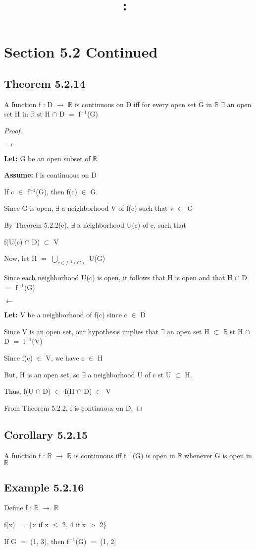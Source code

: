\documentclass{article}
\title{
    \vspace{2in}
    \textmd{\textbf{\hmwkClass:\ \hmwkTitle}}\\
    \normalsize\vspace{0.1in}\small\vspace{0.1in}\large{\textit{\hmwkClassInstructor}}
    \vspace{3in}
}
\author{\hmwkAuthorName}
\date{}
\newcommand{\mt}[1]{\ensuremath{#1}}
\newcommand\bsc[2][\DefaultOpt]{%
  \def\DefaultOpt{#2}%
  \section[#1]{#2}%
}
\newcommand\ssc[2][\DefaultOpt]{%
  \def\DefaultOpt{#2}%
  \subsection[#1]{#2}%
}
\newcommand{\bgpf}{\begin{proof} $ $\newline}
\newcommand{\lt}[1]{\textbf{Let: } #1}
\newcommand{\as}[1]{\textbf{Assume: } #1}
\newcommand{\epf}{\end{proof}}
\newcommand{\br}{\mt{\mathbb{R}} }       %
\newcommand{\mem}{\mt{\in} }
\newcommand{\exs}{\mt{\exists} }
\newcommand{\sbs}{\mt{\subset} }         %
\newcommand{\lra}{ \mt{\longrightarrow} } %
\newcommand{\lla}{ \mt{\longleftarrow} }  %
\newcommand{\bk}[1]{\{#1\}}
\newcommand{\gr}{\mt{>} }
\newcommand{\lse}{\mt{\leq} }
\newcommand{\eql}{\mt{=} }
\newcommand{\uf}[2]{#1\mt{^{#2}}}
\newcommand{\urng}[2]{\mt{\bigcup_{#1}^{#2}}}
\newcommand{\inn}{\mt{\cap} }
\begin{document}
\bsc{Section 5.2 Continued}{
\ssc{Theorem 5.2.14}{

A function f : D \lra \br is continuous on D iff for every open set G in \br \exs an open set H in \br st H \inn D \eql \uf{f}{-1}(G)

\bgpf

\lra 

\lt{G be an open subset of \br}

\as{f is continuous on D}

If c \mem \uf{f}{-1}(G), then f(c) \mem G.

Since G is open, \exs a neighborhood V of f(c) such that v \sbs G

By Theorem 5.2.2(c), \exs a neighborhood U(c) of c, such that 

f(U(c) \inn D) \sbs V

Now, let H \eql \urng{c \mem \uf{f}{-1}(G)}{} U(G)

Since each neighborhood U(c) is open, it follows that H is open and that H \inn D \eql \uf{f}{-1}(G)

\lla

\lt{V be a neighborhood of f(c) since c \mem D}


Since V is an open set, our hypothesis implies that \exs an open set H \sbs \br st H \inn D \eql \uf{f}{-1}(V)

Since f(c) \mem V, we have c \mem H

But, H is an open set, so \exs a neighborhood U of c st U \sbs H.

Thus, f(U \inn D) \sbs f(H \inn D) \sbs V

From Theorem 5.2.2, f is continuous on D.

\epf

}

\ssc{Corollary 5.2.15}{

A function f : \br \lra \br is continuous iff \uf{f}{-1}(G) is open in \br whenever G is open in \br
}

\ssc{Example 5.2.16}{

Define f : \br \lra \br

f(x) \eql \bk{x if x \lse 2, 4 if x \gr 2}

If G \eql (1, 3), then \uf{f}{-1}(G) \eql (1, 2]

}

}
\end{document}
